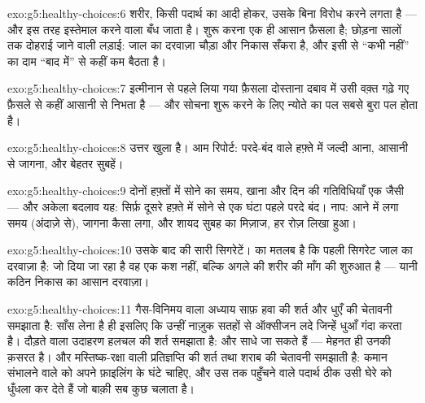 \begin{solution}{exo:g5:healthy-choices:6}
शरीर, किसी पदार्थ का आदी होकर, उसके बिना विरोध करने लगता है --- और इस
तरह इस्तेमाल करने वाला बँध जाता है। शुरू करना एक ही आसान फ़ैसला है;
छोड़ना सालों तक दोहराई जाने वाली लड़ाई: जाल का दरवाज़ा चौड़ा और निकास
सँकरा है, और इसी से ``कभी नहीं'' का दाम ``बाद में'' से कहीं कम बैठता
है।
\end{solution}

\begin{solution}{exo:g5:healthy-choices:7}
इत्मीनान से पहले लिया गया फ़ैसला दोस्ताना दबाव में उसी वक़्त गढ़े गए
फ़ैसले से कहीं आसानी से निभता है --- और सोचना शुरू करने के लिए न्योते
का पल सबसे बुरा पल होता है।
\end{solution}

\begin{solution}{exo:g5:healthy-choices:8}
उत्तर खुला है। आम रिपोर्ट: परदे-बंद वाले हफ़्ते में जल्दी  आना,
आसानी से जागना, और बेहतर सुबहें।
\end{solution}

\begin{solution}{exo:g5:healthy-choices:9}
दोनों हफ़्तों में सोने का समय, खाना और दिन की गतिविधियाँ एक जैसी ---
और अकेला बदलाव यह: सिर्फ़ दूसरे हफ़्ते में सोने से एक घंटा पहले परदे
बंद। नाप:  आने में लगा समय (अंदाज़े से), जागना कैसा लगा, और शायद
सुबह का मिज़ाज, हर रोज़ लिखा हुआ।
\end{solution}

\begin{solution}{exo:g5:healthy-choices:10}
उसके बाद की सारी सिगरेटें।  का मतलब है कि पहली सिगरेट जाल का दरवाज़ा
है: जो दिया जा रहा है वह एक कश नहीं, बल्कि अगले की शरीर की माँग की
शुरुआत है --- यानी कठिन निकास का आसान दरवाज़ा।
\end{solution}

\begin{solution}{exo:g5:healthy-choices:11}
गैस-विनिमय वाला अध्याय साफ़ हवा की शर्त और धुएँ की चेतावनी समझाता है:
साँस लेना है ही इसलिए कि उन्हीं नाज़ुक सतहों से ऑक्सीजन लदे जिन्हें
धुआँ गंदा करता है। दौड़ते  वाला उदाहरण हलचल की शर्त समझाता है: 
और  साधे जा सकते हैं --- मेहनत ही उनकी क़सरत है। और
मस्तिष्क-रक्षा वाली प्रतिज्ञप्ति  की शर्त तथा शराब की चेतावनी
समझाती है: कमान संभालने वाले को अपने फ़ाइलिंग के घंटे चाहिए, और उस तक
पहुँचने वाले पदार्थ ठीक उसी घेरे को धुँधला कर देते हैं जो बाक़ी सब कुछ
चलाता है।
\end{solution}
